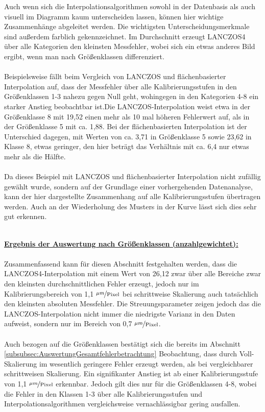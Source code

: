 \documentclass[
fontsize=10pt, 
listof = totoc,
parskip = half	
]{report}
\begin{document}
\noindent Auch wenn sich die Interpolationsalgorithmen sowohl in der Datenbasis als auch visuell im Diagramm kaum unterscheiden lassen, können hier wichtige Zusammenhänge abgeleitet werden. Die wichtigsten Unterscheidungsmerkmale sind außerdem farblich gekennzeichnet. Im Durchschnitt erzeugt LANCZOS4 über alle Kategorien den kleinsten Messfehler, wobei sich ein etwas anderes Bild ergibt, wenn man nach Größenklassen differenziert.
\\\\
Beispielsweise fällt beim Vergleich von LANCZOS und flächenbasierter Interpolation auf, dass der Messfehler über alle Kalibrierungsstufen in den Größenklassen 1-3 nahezu gegen Null geht, wohingegen in den Kategorien 4-8 ein starker Anstieg beobachtbar ist.Die LANCZOS-Interpolation weist etwa in der Größenklasse 8 mit 19,52 einen mehr als 10 mal höheren Fehlerwert auf, als in der Größenklasse 5 mit ca. 1,88. Bei der flächenbasierten Interpolation  ist der Unterschied dagegen, mit Werten von ca. 3,71 in Größenklasse 5 sowie 23,62 in Klasse 8, etwas geringer, den hier beträgt das Verhältnis mit ca. 6,4 nur etwas mehr als die Hälfte. 
\\\\
Da dieses Beispiel mit LANCZOS und flächenbasierter Interpolation nicht zufällig gewählt wurde, sondern auf der Grundlage einer vorhergehenden Datenanalyse, kann der hier dargestellte Zusammenhang auf alle Kalibrierungsstufen übertragen werden. Auch an der Wiederholung des Musters in der Kurve lässt sich dies sehr gut erkennen. 
\\\\
\colorbox{gray!10}{
	\label{box:ErgebnisGesamtauswertung}
	\begin{minipage}{0.975\textwidth}
		\textbf{\underline{Ergebnis der Auswertung nach Größenklassen (anzahlgewichtet):}}
		\\\\
		Zusammenfassend kann für diesen Abschnitt festgehalten werden, dass die LANCZOS4-Interpolation mit einem Wert von 26,12 zwar über alle Bereiche zwar den kleinsten durchschnittlichen Fehler erzeugt, jedoch nur im Kalibrierungsbereich von 1,1 $\nicefrac{\mu m}{\text{Pixel}}$ bei schrittweise Skalierung auch tatsächlich den kleinsten absoluten Messfehler. Die Streuungsparameter zeigen jedoch das die LANCZOS-Interpolation nicht immer die niedrigste Varianz in den Daten aufweist, sondern nur im Bereich von 0,7 $\nicefrac{\mu m}{\text{Pixel}}$.
		\\\\
		Auch bezogen auf die Größenklassen bestätigt sich die bereits im Abschnitt \ref{subsubsec:AuswertungGesamtfehlerbetrachtung} Beobachtung, dass durch Voll-Skalierung im wesentlich geringere Fehler erzeugt werden, als bei vergleichbarer schrittweisen Skalierung.
		Ein signifikanter Anstieg ist ab einer Kalibrierungsstufe von 1,1 $\nicefrac{\mu m}{\text{Pixel}}$ erkennbar. Jedoch gilt dies nur für die Größenklassen 4-8, wobei die Fehler in den Klassen 1-3 über alle Kalibrierungsstufen und Interpolationsalgorithmen vergleichsweise vernachlässigbar gering ausfallen.
	\end{minipage}
}
\\\\\\
\end{document}
